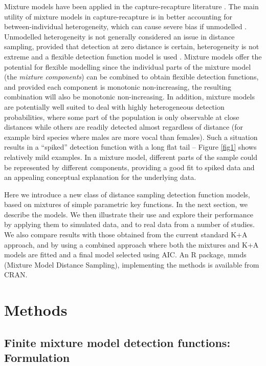 \documentclass[10pt]{article}
\begin{document}
Mixture models have been applied in the capture-recapture literature \cite{Pledger:2000tc, Dorazio:2003uf, Pledger:2005wy, Morgan:2008wy}. The main utility of mixture models in capture-recapture is in better accounting for between-individual heterogeneity, which can cause severe bias if unmodelled \cite{Link:2003wo}. Unmodelled heterogeneity is not generally considered an issue in distance sampling, provided that detection at zero distance is certain, heterogeneity is not extreme and a flexible detection function model is used \cite[Section 11.12]{Buckland:2004ts}. Mixture models offer the potential for flexible modelling since the individual parts of the mixture model (the \textit{mixture components}) can be combined to obtain flexible detection functions, and provided each component is monotonic non-increasing, the resulting combination will also be monotonic non-increasing. In addition, mixture models are potentially well suited to deal with highly heterogeneous detection probabilities, where some part of the population is only observable at close distances while others are readily detected almost regardless of distance (for example bird species where males are more vocal than females). Such a situation results in a ``spiked'' detection function with a long flat tail -- Figure \ref{fig1} shows relatively mild examples. In a mixture model, different parts of the sample could be represented by different components, providing a good fit to spiked data and an appealing conceptual explanation for the underlying data.

Here we introduce a new class of distance sampling detection function models, based on mixtures of simple parametric key functions.  In the next section, we describe the models.  We then illustrate their use and explore their performance by applying them to simulated data, and to real data from a number of studies. We also compare results with those obtained from the current standard K+A approach, and by using a combined approach where both the mixtures and K+A models are fitted and a final model selected using AIC. An R package, mmds \cite{mmds} (Mixture Model Distance Sampling), implementing the methods is available from CRAN.

\section*{Methods}

\subsection*{Finite mixture model detection functions: Formulation}
\end{document}
